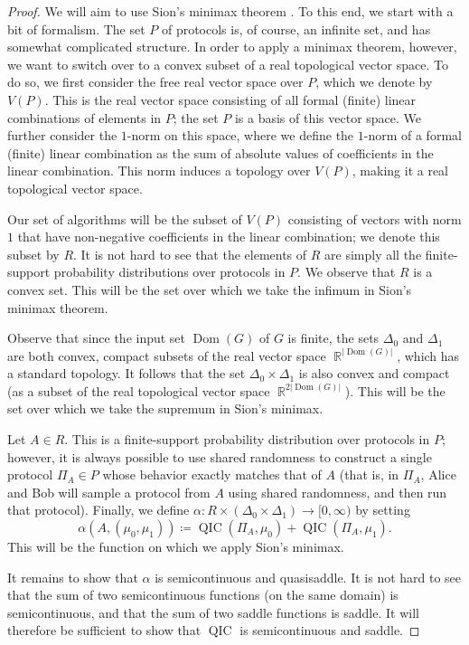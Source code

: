 \documentclass[10pt,a4paper]{article}
\theoremstyle{definition}
\DeclareMathOperator{\Dom}{Dom}
\renewcommand{\>}{\rangle}
\newcommand{\<}{\langle}
\DeclareMathOperator{\bR}{\mathbb{R}}
\DeclareMathOperator{\QIC}{QIC}
\begin{document}
\begin{proof}
We will aim to use Sion's minimax theorem \cite{Sio58}.
To this end, we start with a bit of formalism.
The set $P$ of protocols is, of course, an infinite set,
and has somewhat complicated structure.
In order to apply a minimax theorem, however, we want
to switch over to a convex subset of a real topological
vector space. To do so, we first consider the
free real vector space over $P$, which we denote
by $V(P)$. This is the real vector space consisting
of all formal (finite) linear combinations of elements in $P$;
the set $P$ is a basis of this vector space. We further
consider the $1$-norm on this space, where we define
the $1$-norm of a formal (finite) linear combination
as the sum of absolute values of coefficients in the linear
combination. This norm induces a topology over $V(P)$,
making it a real topological vector space.

Our set of algorithms will be the subset of $V(P)$
consisting of vectors with norm $1$ that have
non-negative coefficients in the linear combination; we denote this
subset by $R$. It is not hard to see that the elements of $R$
are simply all the finite-support probability distributions
over protocols in $P$. We observe that $R$ is a convex set.
This will be the set over which we take the infimum in Sion's
minimax theorem.

Observe that since the input set $\Dom(G)$ of $G$ is finite,
the sets $\Delta_0$ and $\Delta_1$ are both convex, compact
subsets of the real vector space $\bR^{|\Dom(G)|}$, which
has a standard topology. It follows that the
set $\Delta_0\times\Delta_1$ is also convex and compact
(as a subset of the real topological vector space
$\bR^{2|\Dom(G)|}$). This will be the set over which we take the
supremum in Sion's minimax.

Let $A\in R$. This is a finite-support probability
distribution over protocols in $P$; however, it is always
possible to use shared randomness to construct a single
protocol $\Pi_A\in P$ whose behavior exactly matches
that of $A$ (that is, in $\Pi_A$, Alice and Bob will
sample a protocol from $A$ using shared randomness,
and then run that protocol).
Finally, we define
$\alpha\colon R\times(\Delta_0\times\Delta_1)\to[0,\infty)$
by setting
\[\alpha(A,(\mu_0,\mu_1))\coloneqq 
\QIC(\Pi_A,\mu_0)+\QIC(\Pi_A,\mu_1).\]
This will be the function on which we apply Sion's minimax.

It remains to show that $\alpha$ is semicontinuous and
quasisaddle. It is not hard to see that the sum of two
semicontinuous functions (on the same domain) is semicontinuous,
and that the sum of two saddle functions is saddle.
It will therefore be sufficient to show that $\QIC$
is semicontinuous and saddle.


\end{proof}
\end{document}
